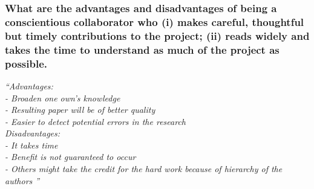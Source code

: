 \documentclass[12pt]{beamer}
\newcommand\ans[1]{{\it ``#1''}}
\begin{document}
\begin{frame} %
\frametitle{ What are the advantages and disadvantages of being a conscientious collaborator who (i) makes careful, thoughtful but timely contributions to the project; (ii) reads widely and takes the time to understand as much of the project as possible.
}


\ans{Advantages:\\
  - Broaden one own’s knowledge\\
  - Resulting paper will be of better quality\\
  - Easier to detect potential errors in the research\\
  Disadvantages:\\
  - It takes time\\
  - Benefit is not guaranteed to occur\\
  - Others might take the credit for the hard work because of hierarchy of the authors
  }


\end{frame}


\end{document}

